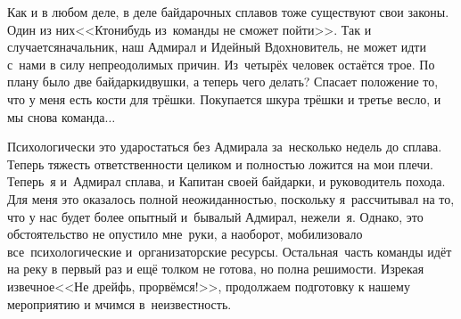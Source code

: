Как и в любом деле, в деле байдарочных сплавов тоже существуют свои законы. Один из них\mdash <<Кто\sdash нибудь из~команды не сможет пойти>>. Так и случается\mdash начальник, наш Адмирал и Идейный Вдохновитель, не может идти с~нами в силу непреодолимых причин. Из~четырёх человек остаётся трое. По плану было две байдарки\sdash двушки, а теперь чего делать? Спасает положение то, что у меня есть кости для трёшки. Покупается шкура трёшки и третье весло, и мы снова команда$\ldots$
 
Психологически это удар\mdash остаться без Адмирала за~несколько недель до сплава. Теперь тяжесть ответственности целиком и полностью ложится на мои плечи. Теперь~я и~Адмирал сплава, и Капитан своей байдарки, и руководитель похода. Для меня это оказалось полной неожиданностью, поскольку я~рассчитывал на то, что у нас будет более опытный и~бывалый Адмирал, нежели~я. Однако, это обстоятельство не опустило мне~руки, а наоборот, мобилизовало все~психологические и~организаторские ресурсы. Остальная~часть команды идёт на реку в первый раз и ещё толком не готова, но полна решимости. Изрекая извечное\mdash <<Не дрейфь, прорвёмся!>>, продолжаем подготовку к нашему мероприятию и мчимся в~неизвестность. 

\begin{center}
\end{center}